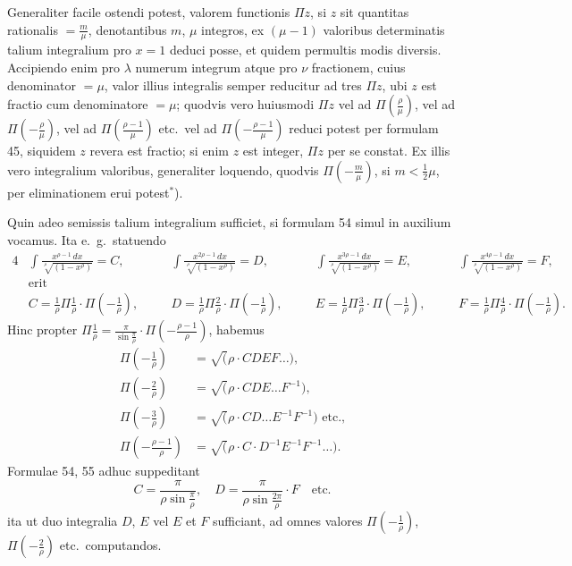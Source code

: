 \documentclass[12pt,a4paper]{article}
\begin{document}
Generaliter facile ostendi potest, valorem functionis $\Pi z$, si $z$ sit quantitas rationalis $=\frac{m}{\mu}$, denotantibus $m$, $\mu$ integros, ex $(\mu-1)$ valoribus determinatis talium integralium pro $x=1$ deduci posse, et quidem permultis modis diversis. Accipiendo enim pro $\lambda$ numerum integrum atque pro $\nu$ fractionem, cuius denominator $=\mu$, valor illius integralis semper reducitur ad tres $\Pi z$, ubi $z$ est fractio cum denominatore $=\mu$; quodvis vero huiusmodi $\Pi z$ vel ad $\Pi(\frac{\rho}{\mu})$, vel ad $\Pi(-\frac{\rho}{\mu})$, vel ad $\Pi(\frac{\rho-1}{\mu})$ etc.\ vel ad $\Pi(-\frac{\rho-1}{\mu})$ reduci potest per formulam 45, siquidem $z$ revera est fractio; si enim $z$ est integer, $\Pi z$ per se constat. Ex illis vero integralium valoribus, generaliter loquendo, quodvis $\Pi(-\frac{m}{\mu})$, si $m<\frac{1}{2}\mu$, per eliminationem erui potest$^*$).

Quin adeo semissis talium integralium sufficiet, si formulam 54 simul in auxilium vocamus. Ita e.\ g.\ statuendo
\begin{alignat*}{4}
&\int\!\frac{x^{\rho-1}\,dx}{\sqrt[\rho]{(1-x^\rho)}} = C,\quad
&&\int\!\frac{x^{2\rho-1}\,dx}{\sqrt[\rho]{(1-x^\rho)}} = D,\quad
&&\int\!\frac{x^{3\rho-1}\,dx}{\sqrt[\rho]{(1-x^\rho)}} = E,\quad
&&\int\!\frac{x^{4\rho-1}\,dx}{\sqrt[\rho]{(1-x^\rho)}} = F,\\
&\text{erit}&&\\
&C = \tfrac{1}{\rho}\Pi\tfrac{1}{\rho}\cdot\Pi(-\tfrac{1}{\rho}),\quad
&&D = \tfrac{1}{\rho}\Pi\tfrac{2}{\rho}\cdot\Pi(-\tfrac{1}{\rho}),\quad
&&E = \tfrac{1}{\rho}\Pi\tfrac{3}{\rho}\cdot\Pi(-\tfrac{1}{\rho}),\quad
&&F = \tfrac{1}{\rho}\Pi\tfrac{4}{\rho}\cdot\Pi(-\tfrac{1}{\rho}).
\end{alignat*}
Hinc propter $\Pi\frac{1}{\rho}=\frac{\pi}{\sin\frac{\pi}{\rho}}\cdot\Pi(-\frac{\rho-1}{\rho})$, habemus
\begin{align*}
\Pi(-\tfrac{1}{\rho}) &= \surd(\rho\cdot CDEF\ldots),\\
\Pi(-\tfrac{2}{\rho}) &= \surd(\rho\cdot CDE\ldots F^{-1}),\\
\Pi(-\tfrac{3}{\rho}) &= \surd(\rho\cdot CD\ldots E^{-1}F^{-1})\text{ etc.,}\\
\Pi(-\tfrac{\rho-1}{\rho}) &= \surd(\rho\cdot C\cdot D^{-1}E^{-1}F^{-1}\ldots).
\end{align*}
Formulae 54, 55 adhuc suppeditant
\[
C = \frac{\pi}{\rho\sin\frac{\pi}{\rho}},\quad D = \frac{\pi}{\rho\sin\frac{2\pi}{\rho}}\cdot F\quad \text{etc.}
\]
ita ut duo integralia $D$, $E$ vel $E$ et $F$ sufficiant, ad omnes valores $\Pi(-\frac{1}{\rho})$, $\Pi(-\frac{2}{\rho})$ etc.\ computandos.
\end{document}

